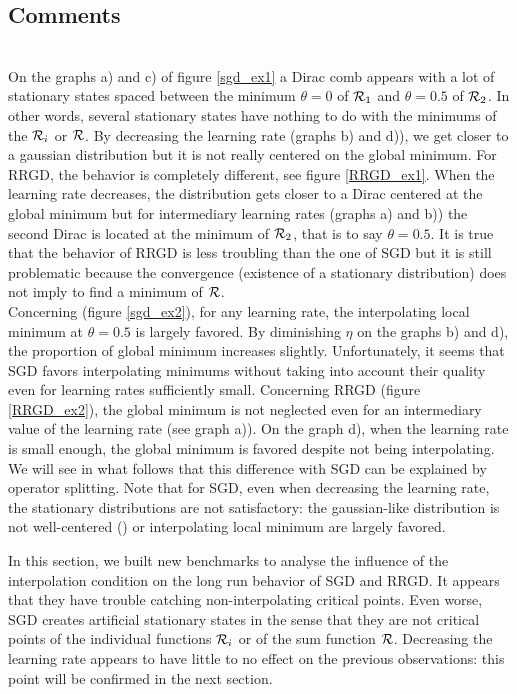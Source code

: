 \documentclass[article,authoryear,jmlmc]{beg_32}             %
\begin{document}
\subsection{Comments}
~~\\
On the graphs a) and c) of figure \ref{sgd_ex1} a Dirac comb appears with a lot of stationary states spaced between the minimum $\theta=0$ of $\mathcal{R}_1$ and $\theta=0.5$ of $\mathcal{R}_2$. In
other words, several stationary states have nothing to do with the minimums of the $\mathcal{R}_i$ or $\mathcal{R}$. By decreasing the learning rate (graphs b) and d)), we get closer to a gaussian
distribution but it is not really centered on the global minimum. For RRGD, the behavior is completely different, see figure \ref{RRGD_ex1}. When the learning rate decreases, the distribution gets closer to a Dirac centered at the global minimum but for intermediary learning rates (graphs a) and b)) the second Dirac is located at the minimum of $\mathcal{R}_2$, that is to say $\theta=0.5$. It is true that the behavior of RRGD is less troubling than the one of SGD but it is still problematic because the convergence (existence of a stationary distribution) does not imply to find a minimum of $\mathcal{R}$. \\
Concerning \exTwo (figure \ref{sgd_ex2}), for any learning rate, the interpolating local minimum at $\theta=0.5$ is largely favored. By diminishing $\eta$ on the graphs b) and d), the proportion of global minimum increases slightly. Unfortunately, it seems that SGD favors interpolating minimums without taking into account their quality even for learning rates sufficiently small. Concerning RRGD (figure \ref{RRGD_ex2}), the global minimum is not neglected even for an intermediary value of the learning rate (see graph a)). On the graph d), when the learning rate is small enough, the global minimum is favored despite not being interpolating. We will see in what follows that this difference with SGD can be explained by operator splitting. 
Note that for SGD, even when decreasing the learning rate, the stationary distributions are not satisfactory: the gaussian-like distribution is not well-centered (\exOne) or interpolating
local minimum are largely favored.

In this section, we built new benchmarks to analyse the influence of the interpolation condition on the long run behavior of SGD and RRGD. It appears that they have trouble
catching non-interpolating critical points. Even worse, SGD creates artificial stationary states in the sense that they are not critical points of the individual functions $\mathcal{R}_i$
or of the sum function $\mathcal{R}$. Decreasing the learning rate appears to have little to no effect on the previous observations: this point will be confirmed in the next section. 
\end{document}
